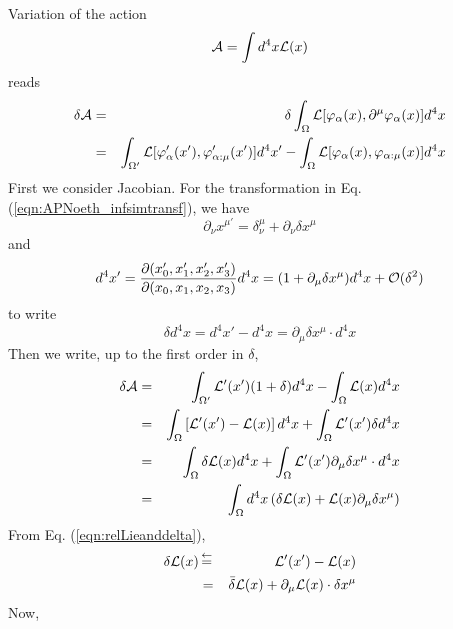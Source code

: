 Variation of the action
\begin{equation}
{\cal A} = \int d^4 x {\cal L}(x)
\end{equation}
reads
\begin{eqnarray*}
\delta {\cal A}
&=&
\delta \int_\Omega {\cal L} [\varphi_\alpha(x), \partial^\mu\varphi_\alpha(x)] d^4 x
\\
&=&
\int_{\Omega'} {\cal L} [\varphi_\alpha'(x'), \varphi_{\alpha:\mu}'(x')] d^4 x'
-
\int_{\Omega} {\cal L} [\varphi_\alpha(x), \varphi_{\alpha:\mu}(x)] d^4 x
\end{eqnarray*}
First we consider Jacobian.
For the transformation in Eq. (\ref{eqn:APNoeth_infsimtransf}), we have
\[
\partial_\nu x^{\mu '} = \delta_\nu^\mu + \partial_\nu \delta x^\mu
\]
and
\begin{equation}
d^4 x' = \frac{\partial(x_0', x_1',x_2',x_3')}{\partial(x_0, x_1,x_2,x_3)} d^4x
=
(1 + \partial_\mu \delta x^\mu) d^4 x 
+ {\cal O} (\delta^2)
\end{equation}
to write
\begin{equation}
\delta d^4 x 
= d^4 x' - d^4 x = \partial_\mu \delta x^\mu \cdot d^4 x 
\end{equation}
Then we write, up to the first order in $\delta$,
\begin{eqnarray}
\delta {\cal A} 
&=&
\int_{\Omega'}
 {\cal L}' (x') (1 + \delta) d^4 x
-
\int_{\Omega} {\cal L}(x)  d^4 x
\nonumber\\
&=&
\int_{\Omega} \left[ 
{\cal L}' (x') - {\cal L}(x)  \right] d^4 x
+
\int_{\Omega} 
{\cal L}' (x')
\delta d^4 x
\nonumber\\
&=&
\int_{\Omega}
\delta {\cal L} (x)
d^4 x
+
\int_{\Omega} 
{\cal L}' (x')
\partial_\mu \delta x^\mu \cdot d^4 x 
\nonumber\\
&=&
\int_{\Omega} 
d^4 x
\left(
\delta {\cal L} (x)
+
{\cal L} (x)
\partial_\mu \delta x^\mu 
\right)
\label{eqn:deltaAction}
\end{eqnarray}
From Eq. (\ref{eqn:relLieanddelta}),
\begin{eqnarray}
\delta {\cal L} (x)
&\,\mbox{$\stackrel{\leftarrow}{=}$}\,&
{\cal L}' (x') - {\cal L}(x)  
\nonumber\\
&=&
\bar{\delta}{\cal L} (x) + \partial_\mu {\cal L}(x)\cdot \delta x^\mu
\label{eqn:deltaLagrangiandens}
\end{eqnarray}
Now,
